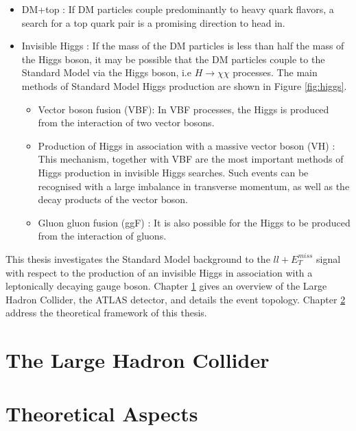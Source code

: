 \documentclass[11pt,a4paper,openright,twoside]{report}
\newcommand{\met}{$E_T^{miss}$ }
\begin{document}
\begin{itemize}
\item DM+top : If DM particles couple predominantly to heavy quark flavors, a search for a top quark pair is a promising direction to head in.
\item Invisible Higgs :  If the mass of the DM particles is less than half the mass of the Higgs boson, it may be possible that the DM particles couple to the Standard Model via the Higgs boson, i.e $H\to\chi\chi$ processes. The main methods of Standard Model Higgs production are shown in Figure \ref{fig:higgs}.
	\begin{itemize}
	\item Vector boson fusion (VBF): In VBF processes, the Higgs is produced from the interaction of two vector bosons.
	\item Production of Higgs in association with a massive vector boson (VH) : This mechanism, together with VBF are the most important methods of Higgs production in invisible Higgs searches. Such events can be recognised with a large imbalance in transverse momentum, as well as the decay products of the vector boson.
	\item Gluon gluon fusion (ggF) : It is also possible for the Higgs to be produced from the interaction of gluons.
	\end{itemize}
\end{itemize}

This thesis investigates the Standard Model background to the $ll+$\met signal with respect to the production of an invisible Higgs in association with a leptonically decaying gauge boson. Chapter \ref{ch:LHC} gives an overview of the Large Hadron Collider, the ATLAS detector, and details the event topology. Chapter \ref{ch:theory} address the theoretical framework of this thesis.

\chapter{The Large Hadron Collider}\label{ch:LHC}

\pagestyle{plain}

\chapter{Theoretical Aspects}\label{ch:theory}
\end{document}
